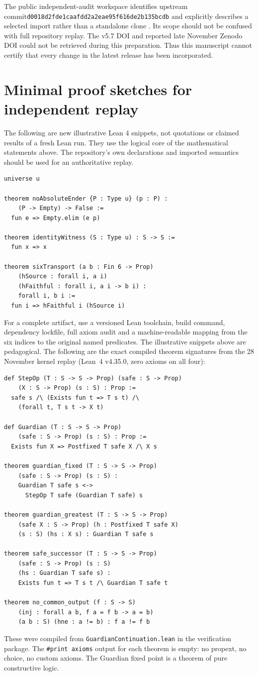 \documentclass[11pt,a4paper]{article}
\begin{document}
The public independent-audit workspace identifies upstream commit\newline \texttt{d0018d2fde1caafdd2a2}\allowbreak\texttt{eae95f616de2b135bcdb} and explicitly describes a selected import rather than a standalone clone \cite{audit}. Its scope should not be confused with full repository replay. The v5.7 DOI and reported late November Zenodo DOI could not be retrieved during this preparation. Thus this manuscript cannot certify that every change in the latest release has been incorporated.
\section{Minimal proof sketches for independent replay}
The following are new illustrative Lean 4 snippets, not quotations or claimed results of a fresh Lean run. They use the logical core of the mathematical statements above. The repository's own declarations and imported semantics should be used for an authoritative replay.
\begin{verbatim}
universe u

theorem noAbsoluteEnder {P : Type u} (p : P) :
    (P -> Empty) -> False :=
  fun e => Empty.elim (e p)

theorem identityWitness (S : Type u) : S -> S :=
  fun x => x

theorem sixTransport (a b : Fin 6 -> Prop)
    (hSource : forall i, a i)
    (hFaithful : forall i, a i -> b i) :
    forall i, b i :=
  fun i => hFaithful i (hSource i)
\end{verbatim}
For a complete artifact, use a versioned Lean toolchain, build command, dependency lockfile, full axiom audit and a machine-readable mapping from the six indices to the original named predicates. The illustrative snippets above are pedagogical. The following are the exact compiled theorem signatures from the 28 November kernel replay (Lean~4 v4.35.0, zero axioms on all four):
\begin{verbatim}
def StepOp (T : S -> S -> Prop) (safe : S -> Prop)
    (X : S -> Prop) (s : S) : Prop :=
  safe s /\ (Exists fun t => T s t) /\
    (forall t, T s t -> X t)

def Guardian (T : S -> S -> Prop)
    (safe : S -> Prop) (s : S) : Prop :=
  Exists fun X => Postfixed T safe X /\ X s

theorem guardian_fixed (T : S -> S -> Prop)
    (safe : S -> Prop) (s : S) :
    Guardian T safe s <->
      StepOp T safe (Guardian T safe) s

theorem guardian_greatest (T : S -> S -> Prop)
    (safe X : S -> Prop) (h : Postfixed T safe X)
    (s : S) (hs : X s) : Guardian T safe s

theorem safe_successor (T : S -> S -> Prop)
    (safe : S -> Prop) (s : S)
    (hs : Guardian T safe s) :
    Exists fun t => T s t /\ Guardian T safe t

theorem no_common_output (f : S -> S)
    (inj : forall a b, f a = f b -> a = b)
    (a b : S) (hne : a != b) : f a != f b
\end{verbatim}
These were compiled from \texttt{GuardianContinuation.lean} in the verification package. The \texttt{\#print axioms} output for each theorem is empty: no propext, no choice, no custom axioms. The Guardian fixed point is a theorem of pure constructive logic.
\end{document}
